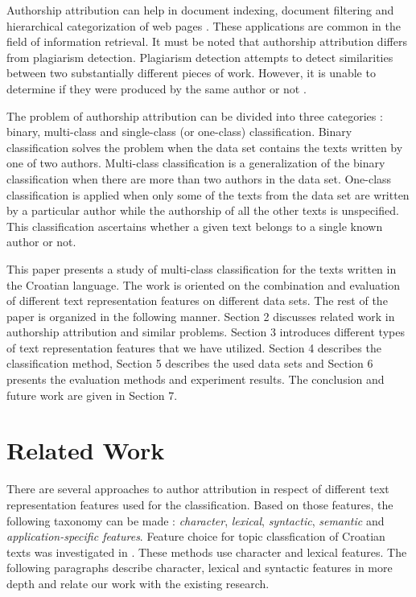 \documentclass{llncs}
\begin{document}
Authorship attribution can help in document indexing, document filtering and
hierarchical categorization of web pages \cite{luyckx2005shallow}. These
applications are common in the field of information retrieval. It must be noted
that authorship attribution differs from plagiarism detection. Plagiarism
detection attempts to detect similarities between two substantially different
pieces of work. However, it is unable to determine if they were produced by the
same author or not
\cite{de2001mining}.

The problem of authorship attribution can be divided into three categories
\cite{zhao2005effective}: binary, multi-class and single-class (or one-class)
classification. Binary classification solves the problem when the data set
contains the texts written by one of two authors. Multi-class classification is a
generalization of the binary classification when there are more than two authors
in the data set. One-class classification is applied when only some of the texts
from the data set are written by a particular author while the authorship of all
the other texts is unspecified. This classification ascertains whether a given
text belongs to a single known author or not.

This paper presents a study of multi-class classification for the texts written
in the Croatian language. The work is oriented on the combination and evaluation
of different text representation features on different data sets. The rest of
the paper is organized in the following manner. Section 2 discusses related work in authorship attribution
and similar problems. Section 3 introduces different types of text representation
features that we have utilized. Section 4 describes the classification method, Section 5
describes the used data sets and Section 6 presents the evaluation methods and
experiment results. The conclusion and future work are given in Section 7.

\section{Related Work}
There are several approaches to author attribution in respect of different text
representation features used for the classification. Based on those features, the
following taxonomy can be made \cite{stamatatos2009survey}: \emph{character}, \emph{lexical}, \emph{syntactic}, \emph{semantic} and \emph{application-specific features}. Feature choice for topic classfication of Croatian texts was investigated in \cite{malenica,silic}. These methods use character and lexical features. The following paragraphs
describe character, lexical and syntactic features in more depth and relate our
work with the existing research.
\end{document}
